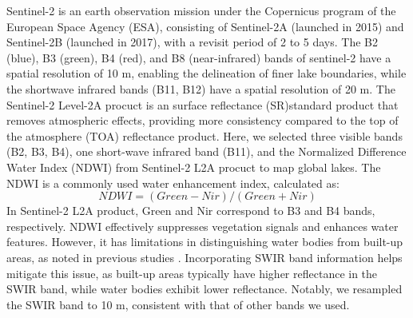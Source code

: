 \documentclass[preprint,12pt,authoryear]{elsarticle}
\begin{document}
Sentinel-2 is an earth observation mission under the Copernicus program of the European Space Agency (ESA), consisting of Sentinel-2A (launched in 2015) and Sentinel-2B (launched in 2017), with a revisit period of 2 to 5 days. The B2 (blue), B3 (green), B4 (red), and B8 (near-infrared) bands of sentinel-2 have a spatial resolution of 10 m, enabling the delineation of finer lake boundaries, while the shortwave infrared bands (B11, B12) have a spatial resolution of 20 m. The Sentinel-2 Level-2A procuct is an surface reflectance (SR)standard product that removes atmospheric effects, providing more consistency compared to the top of the atmosphere (TOA) reflectance product. Here, we selected three visible bands (B2, B3, B4), one short-wave infrared band (B11), and the Normalized Difference Water Index (NDWI) \citep{mcfeeters_use_1996} from Sentinel-2 L2A procuct to map global lakes. The NDWI is a commonly used water enhancement index, calculated as:
\begin{equation}
NDWI = (Green-Nir)/(Green+Nir)
\end{equation}
In Sentinel-2 L2A product, Green and Nir correspond to B3 and B4 bands, respectively. NDWI effectively suppresses vegetation signals and enhances water features. However, it has limitations in distinguishing water bodies from built-up areas, as noted in previous studies \citep{xu_modification_2006}. Incorporating SWIR band information helps mitigate this issue, as built-up areas typically have higher reflectance in the SWIR band, while water bodies exhibit lower reflectance. Notably, we resampled the SWIR band to 10 m, consistent with that of other bands we used.
\end{document}
